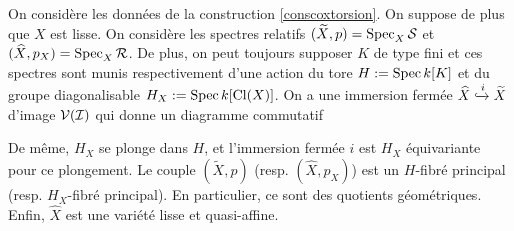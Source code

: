 \begin{cons}\label{conscoxtorsionlisse}
On considère les données de la construction \ref{conscoxtorsion}. On suppose de plus que $X$ est lisse. On considère les spectres relatifs $(\widetilde{X}, p)=\operatorname{Spec}_X \mathcal{S}$ et $(\widehat{X},p_X)=\operatorname{Spec}_X \mathcal{R}$. De plus, on peut toujours supposer $K$ de type fini et ces spectres sont munis respectivement d'une action du tore $H:=\operatorname{Spec} k[K]$ et du groupe diagonalisable $H_X:=\operatorname{Spec} k[\operatorname{Cl}(X)]$. On a une immersion fermée $\widehat{X}\xhookrightarrow{i}\widetilde{X}$ d'image $\mathcal{V}(\mathcal{I})$ qui donne un diagramme commutatif

	\begin{center}
	\end{center}
De même, $H_X$ se plonge dans $H$, et l'immersion fermée $i$ est $H_X$ équivariante pour ce plongement. Le couple $(\widetilde{X},p)$ (resp. $(\widehat{X},p_X)$) est un $H$-fibré principal (resp. $H_X$-fibré principal). En particulier, ce sont des quotients géométriques. Enfin, $\widehat{X}$ est une variété lisse et quasi-affine.
\end{cons}
